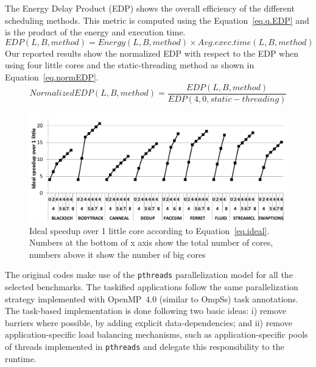 The Energy Delay Product (EDP) shows the overall efficiency of the different scheduling methods.
This metric is computed using the Equation~\ref{eq.q.EDP} and is the product of the energy and execution time.
\begingroup\makeatletter\def\f@size{10}\check@mathfonts
\begin{equation}
\text{$EDP(L, B, method) = Energy(L, B, method) \times Avg. exec. time(L, B, method)$}
\label{eq.EDP}
\end{equation}
Our reported results show the normalized EDP with respect to the EDP when using four little cores and the static-threading method as shown in Equation~\ref{eq.normEDP}.
\begingroup\makeatletter\def\f@size{10}\check@mathfonts
\begin{equation}
\text{$Normalized EDP(L, B, method)$} = \frac{\text{$EDP(L, B, method)$}}{\text{$EDP(4, 0, static-threading)$}}
\label{eq.normEDP}
\end{equation}
\endgroup




%

\begin{figure}[t]%
	\centering
	\includegraphics[width=1\columnwidth]{figures/ideal_speedup.pdf}
	\caption{Ideal speedup over 1 little core according to Equation~\ref{eq.ideal}. Numbers at the bottom of x axis show the total number of cores, numbers above it show the number of big cores}
	\label{fig:ideal}%
\end{figure}

The original codes make use of the \texttt{pthreads} parallelization model for all the selected benchmarks. The taskified applications follow the same parallelization strategy implemented with OpenMP~4.0 (similar to OmpSs)  task annotations.
The task-based implementation is done following two basic ideas: i) remove barriers where possible, by adding explicit data-dependencies; and ii) remove application-specific load balancing mechanisms, such as application-specific pools of threads implemented in \texttt{pthreads} and delegate this responsibility to the runtime.

